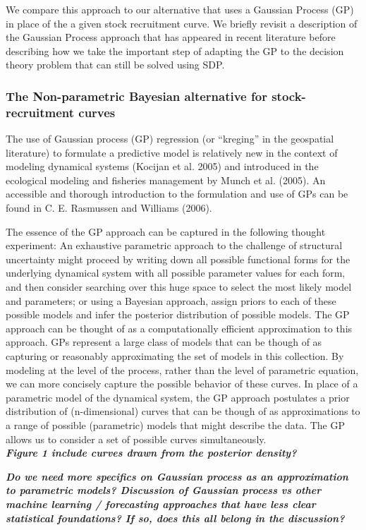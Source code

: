 \documentclass[author-year, review]{elsarticle} %
\begin{document}
We compare this approach to our alternative that uses a Gaussian Process
(GP) in place of the a given stock recruitment curve. We briefly revisit
a description of the Gaussian Process approach that has appeared in
recent literature before describing how we take the important step of
adapting the GP to the decision theory problem that can still be solved
using SDP.

\subsubsection{The Non-parametric Bayesian alternative for
stock-recruitment curves}

The use of Gaussian process (GP) regression (or ``kreging'' in the
geospatial literature) to formulate a predictive model is relatively new
in the context of modeling dynamical systems (Kocijan et al. 2005) and
introduced in the ecological modeling and fisheries management by Munch
et al. (2005). An accessible and thorough introduction to the
formulation and use of GPs can be found in C. E. Rasmussen and Williams
(2006).

The essence of the GP approach can be captured in the following thought
experiment: An exhaustive parametric approach to the challenge of
structural uncertainty might proceed by writing down all possible
functional forms for the underlying dynamical system with all possible
parameter values for each form, and then consider searching over this
huge space to select the most likely model and parameters; or using a
Bayesian approach, assign priors to each of these possible models and
infer the posterior distribution of possible models. The GP approach can
be thought of as a computationally efficient approximation to this
approach. GPs represent a large class of models that can be though of as
capturing or reasonably approximating the set of models in this
collection. By modeling at the level of the process, rather than the
level of parametric equation, we can more concisely capture the possible
behavior of these curves. In place of a parametric model of the
dynamical system, the GP approach postulates a prior distribution of
(n-dimensional) curves that can be though of as approximations to a
range of possible (parametric) models that might describe the data. The
GP allows us to consider a set of possible curves simultaneously.\\
\textbf{\emph{Figure 1 include curves drawn from the posterior
density?}}

\textbf{\emph{Do we need more specifics on Gaussian process as an
approximation to parametric models? Discussion of Gaussian process vs
other machine learning / forecasting approaches that have less clear
statistical foundations? If so, does this all belong in the
discussion?}}
\end{document}
